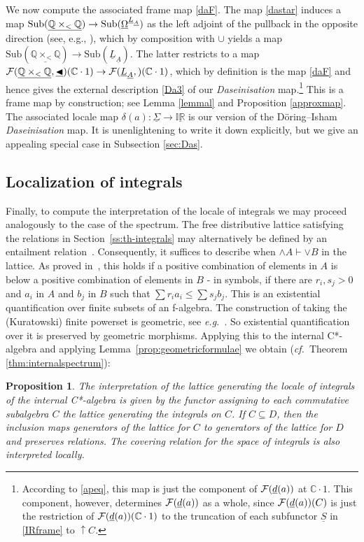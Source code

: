\documentclass[11pt]{article}
\newcommand{\Q}{\mathbb{Q}}
\newcommand{\uIR}{\underline{\mathbb{IR}}}
\newcommand{\drie}{\vartriangleleft}
\newcommand{\coveredd}{\ensuremath{\mathop{\blacktriangleleft}}}
\newcommand{\raw}{\rightarrow} \newcommand{\rat}{\mapsto}
\newcommand{\x}{\times} \newcommand{\hb}{\hbar}
\newcommand{\er}{\eqref}
\newcommand{\dl}{\delta} \newcommand{\Dl}{\Delta}
\newcommand{\C}{{\mathbb C}} \newcommand{\D}{{\mathbb D}}
\newcommand{\functor}[1]{\ensuremath{\underline{#1}}}
\newcommand{\uA}{\underline{A}}
\newcommand{\eg}{\textit{e.g.}}
\newcommand{\ulS}{\functor{\Sigma}}
\newtheorem{proposition}[theorem]{Proposition}
\begin{document}
We now compute the associated frame map \er{daF}.
The map \er{dastar} induces a map $\mathrm{Sub}(\underline{\Q\x_{<}\Q})\raw\mathrm{Sub}(\underline{\Om}^{\underline{L}_{\uA}})$ as the left adjoint of the pullback in the opposite direction
 (see, e.g., \cite[Exercise I.10]{maclanemoerdijk92}), which by composition with $\cup$ yields a map  $\mathrm{Sub}(\underline{\Q\x_{<}\Q})\raw\mathrm{Sub}(\underline{L}_{\uA})$. The latter restricts to a map $ \CF(\underline{\Q\x_{<}\Q},\underline{\coveredd})(\C\cdot 1)\raw
  \CF(\underline{L}_{\uA},\underline{\drie})(\C\cdot 1)$, which by definition is the map \er{daF}
  and hence gives the external description \er{Da3} of our {\it Daseinisation} map.\footnote{According to \er{apeq}, this map
   is just the component of ${\mathcal F}(\underline{d}(a))$ at $\C\cdot 1$. This component, however, determines ${\mathcal F}(\underline{d}(a))$ as a whole, since ${\mathcal F}(\underline{d}(a))(C)$ is just the restriction
of  $\CF(\underline{d}(a))(\C\cdot 1)$ to  the truncation of each subfunctor $\underline{S}$ in \er{IRframe}  to $\uparrow\! C$.} This is a frame map by construction; see
Lemma \er{lemmal} and Proposition \er{approxmap}.  The associated 
 locale map $\dl(a):\ulS\raw\uIR$  is our version of the D\"{o}ring--Isham {\it Daseinisation} map. It is unenlightening to write it down explicitly, but we give an appealing special case in Subsection \ref{sec:Das}.
\subsection{Localization of integrals}
Finally, to compute the interpretation of the locale of integrals we
may proceed analogously to  the case of the spectrum.
 The free distributive lattice satisfying the relations in
Section~\ref{ss:th-integrals} may alternatively be defined by an entailment
relation~\cite{coquand:entail}. Consequently, it suffices to describe when
$\wedge A \vdash \vee B$ in the lattice. As proved
in~\cite{coquand05, Coquand/Spitters:integrals-valuations}, this holds if
a positive combination of elements in $A$ is below a positive combination of
elements in $B$ - in symbols, if there are $r_i,s_j>0$ and $a_i$ in
$A$ and $b_j$ in $B$ such that $\sum r_i a_i \leqslant \sum s_j b_j$. This
is an existential quantification over finite subsets of an
f-algebra. The construction of taking the (Kuratowski) finite
powerset is geometric, see \eg\ \cite{Vic:LocTopSp}. So existential
quantification over it is preserved by geometric morphisms. Applying this to the
internal C*-algebra and applying Lemma~\ref{prop:geometricformulae} we
obtain ({\it cf.}\ Theorem \ref{thm:internalspectrum}):
\begin{proposition}
  The interpretation of the lattice generating the locale of integrals
  of the internal C*-algebra is given by the functor assigning to
  each commutative subalgebra $C$ the lattice generating the integrals
  on $C$. If $C\subseteq D$, then the inclusion maps generators of the
  lattice for $C$ to generators of the lattice for $D$ and preserves
  relations. The covering relation for the space of integrals is also
  interpreted locally.
\end{proposition}
\end{document}
